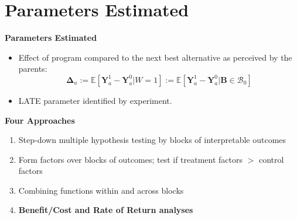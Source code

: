 \documentclass[static]{JJH-Beamer}
\begin{document}

\section{Parameters Estimated}

\begin{frame}

\begin{block}{}
\begin{center}
\textbf{Parameters Estimated}
\end{center}
\end{block}

\end{frame}

\begin{frame}

\begin{itemize}
\item Effect of program compared to the next best alternative as perceived by the parents:
	\begin{equation}\label{eq:effect}
	\bm{\Delta}_a := \mathbb{E} \left[ \bm{Y}^1_a -  \bm{Y}^0_a | W =1 \right] := \mathbb{E} \left[\bm{Y}^1_a - \bm{Y}^0_a | \bm{B} \in \mathcal{B}_0 \right]
	\end{equation}
\item LATE parameter identified by experiment.
\end{itemize}

\end{frame}

\begin{frame}

\begin{center}
\textbf{Four Approaches}
\end{center}

\begin{enumerate}[(1)]
\item Step-down multiple hypothesis testing by blocks of interpretable outcomes
\item Form factors over blocks of outcomes; test if treatment factors $>$ control factors
\item Combining functions within and across blocks
\item \textbf{Benefit/Cost and Rate of Return analyses}
\end{enumerate}

\end{frame}
\end{document}
